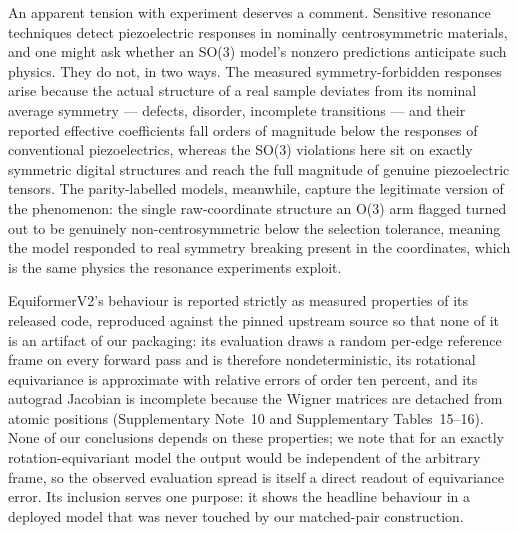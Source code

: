An apparent tension with experiment deserves a comment. Sensitive resonance techniques detect piezoelectric responses in nominally centrosymmetric materials\cite{aktas2021nominally}, and one might ask whether an SO(3) model's nonzero predictions anticipate such physics. They do not, in two ways. The measured symmetry-forbidden responses arise because the actual structure of a real sample deviates from its nominal average symmetry --- defects, disorder, incomplete transitions --- and their reported effective coefficients fall orders of magnitude below the responses of conventional piezoelectrics, whereas the SO(3) violations here sit on exactly symmetric digital structures and reach the full magnitude of genuine piezoelectric tensors. The parity-labelled models, meanwhile, capture the legitimate version of the phenomenon: the single raw-coordinate structure an O(3) arm flagged turned out to be genuinely non-centrosymmetric below the selection tolerance, meaning the model responded to real symmetry breaking present in the coordinates, which is the same physics the resonance experiments exploit.

EquiformerV2's behaviour is reported strictly as measured properties of its released code, reproduced against the pinned upstream source so that none of it is an artifact of our packaging: its evaluation draws a random per-edge reference frame on every forward pass and is therefore nondeterministic, its rotational equivariance is approximate with relative errors of order ten percent, and its autograd Jacobian is incomplete because the Wigner matrices are detached from atomic positions (Supplementary Note~10 and Supplementary Tables~15--16). None of our conclusions depends on these properties; we note that for an exactly rotation-equivariant model the output would be independent of the arbitrary frame, so the observed evaluation spread is itself a direct readout of equivariance error. Its inclusion serves one purpose: it shows the headline behaviour in a deployed model that was never touched by our matched-pair construction.

